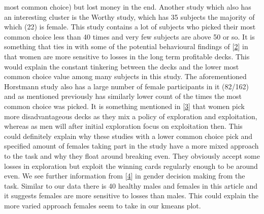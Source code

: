 \documentclass[letterpaper,10pt,english]{jupyterBook}
\begin{document}
most common choice) but lost money in the end. Another study which also has an interesting cluster is the Worthy study, which has 35 subjects the majority of which (22) is female. This study contains a lot of subjects who picked their most common choice less than 40 times and very few subjects are above 50 or so. It is something that ties in with some of the potential behavioural findings of {[}\hyperlink{cite.zbibliography:id3}{2}{]} in that women are more sensitive to losses in the long term profitable decks. This would explain the constant tinkering between the decks and the lower most common choice value among many subjects in this study. The aforementioned Horstmann study also has a large number of female participants in it (82/162) and as mentioned previously has similarly lower count of the times the most common choice was picked. It is something mentioned in {[}\hyperlink{cite.zbibliography:id4}{3}{]} that women pick more disadvantageous decks as they mix a policy of exploration and exploitation, whereas as men will after initial exploration focus on exploitation then. This could definitely explain why these studies with a lower common choice pick and specified amount of females taking part in the study have a more mixed approach to the task and why they float around breaking even. They obviously accept some losses in exploration but exploit the winning cards regularly enough to be around even. We see further information from {[}\hyperlink{cite.zbibliography:id5}{4}{]} in gender decision making from the task. Similar to our data there is 40 healthy males and females in this article and it suggests females are more sensitive to losses than males. This could explain the more varied approach females seem to take in our k\sphinxhyphen{}means plot.

\begin{sphinxVerbatim}[commandchars=\\\{\}]
   
\PYG{p}{[}\PYG{p}{]}  
\end{sphinxVerbatim}
\end{document}
